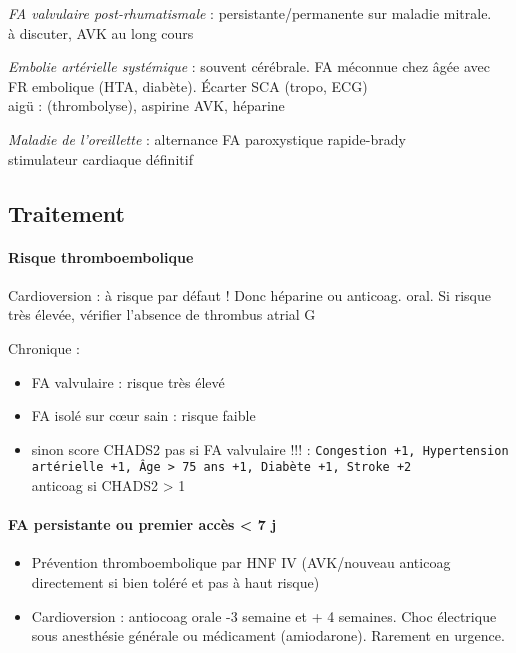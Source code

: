 \textit{FA valvulaire post-rhumatismale}  : persistante/permanente sur maladie
mitrale. \\
\hspace*{10pt}\thus à discuter, AVK au long cours

\textit{Embolie artérielle systémique} : souvent cérébrale. FA méconnue chez
\female{} âgée avec FR embolique (HTA, diabète). Écarter SCA (tropo, ECG)\\
\hspace*{10pt}\thus aigü : (thrombolyse), aspirine \arrow{} AVK, héparine

\textit{Maladie de l'oreillette}  : alternance FA paroxystique rapide-brady\\
\hspace*{10pt}\thus stimulateur cardiaque définitif

\subsection{Traitement}
\paragraph{Risque thromboembolique}
Cardioversion : à risque par défaut ! Donc héparine ou anticoag. oral. 
Si risque très élevée, vérifier l'absence de thrombus atrial G

Chronique :
\begin{itemize}
  \item FA valvulaire : risque très élevé
  \item FA isolé sur c\oe{}ur sain : risque faible
  \item sinon score CHADS2 \danger{} pas si FA valvulaire !!! : \texttt{Congestion +1,
    Hypertension artérielle +1, Âge > 75 ans +1, Diabète +1, Stroke +2}\\
    anticoag si CHADS2 > 1
\end{itemize}

\paragraph{FA persistante ou premier accès < 7 j}
\begin{itemize}
  \item Prévention thromboembolique par HNF IV (AVK/nouveau anticoag
    directement si bien toléré et pas à haut risque)
  \item Cardioversion : antiocoag orale -3 semaine et + 4 semaines. Choc
    électrique sous anesthésie générale ou médicament (amiodarone). Rarement en
    urgence.
\end{itemize}


